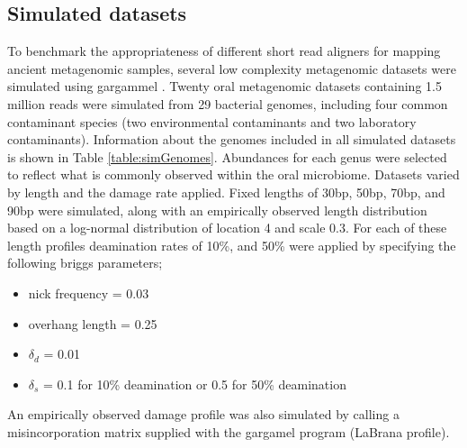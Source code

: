 \documentclass[12pt, a4paper]{article}
\begin{document}

\subsection{Simulated datasets}
 
To benchmark the appropriateness of different short read aligners for mapping ancient metagenomic samples, several low complexity metagenomic datasets were simulated using gargammel \cite{Renaud:2017aa}.
Twenty oral metagenomic datasets containing 1.5 million reads were simulated from 29 bacterial genomes, including four common contaminant species (two environmental contaminants and two laboratory contaminants). 
Information about the genomes included in all simulated datasets is shown in Table \ref{table:simGenomes}. 
Abundances for each genus were selected to reflect what is commonly observed within the oral microbiome.
Datasets varied by length and the damage rate applied. 
Fixed lengths of 30bp, 50bp, 70bp, and 90bp were simulated, along with an empirically observed length distribution based on a log-normal distribution of location 4 and scale 0.3. 
For each of these length profiles deamination rates of 10\%, and 50\% were applied by specifying the following briggs parameters; 
\begin{itemize}\singlespacing
\item nick frequency = 0.03
\item overhang length = 0.25
\item $\delta_d$ = 0.01
\item $\delta_s$ = 0.1 for 10\% deamination or 0.5 for 50\% deamination
\end{itemize}
An empirically observed damage profile was also simulated by calling a misincorporation matrix supplied with the gargamel program (LaBrana profile).  

%
\end{document}
